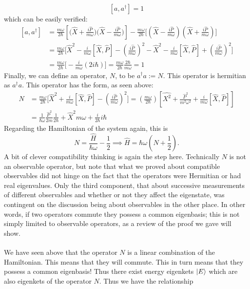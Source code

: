 $$
[a,a^{\dagger}]=1
$$
which can be easily verified:
$$
\begin{aligned}
[a,a^{\dagger}]&=\frac{m\omega}{2\hbar}\left[\biggl(\hat{X}+\frac{i\hat{P}}{m\omega}\biggr)\biggl(\hat{X}-\frac{i\hat{P}}{m\omega}\biggr)\right]-\frac{m\omega}{2\hbar}\biggl[\left(\hat{X}-\frac{i\hat{P}}{m\omega}\right)\left(\hat{X}+\frac{i\hat{P}}{m\omega}\right)\biggr]\\
&=\frac{m\omega}{2\hbar}\biggl[\hat{X}^{2}-\frac{i}{m\omega}[\hat{X},\hat{P}]-\left(\frac{i\hat{P}}{m\omega}\right)^2-\hat{X}^2-\frac{i}{m\omega}[\hat{X},\hat{P}]+\left(\frac{i\hat{P}}{m\omega}\right)^2\biggr]\\
&=\frac{m\omega}{2\hbar}\biggl[-\frac{i}{m\omega}(2i\hbar)\biggr]=\frac{m\omega}{2\hbar}\frac{2\hbar}{m\omega}=1
\end{aligned}
$$
Finally, we can define an operator, $N$, to be $a^{\dagger}a:=N$. This operator is hermitian as $a^{\dagger}a$.
This operator has the form, as seen above:
$$
\begin{aligned}
N&=\frac{m\omega}{2\hbar}\biggl[\hat{X}^2+\frac{i}{m\omega}[\hat{X},\hat{P}]-\left(\frac{i\hat{P}}{m\omega}\right)^2\biggr]=\left(\frac{m\omega}{2\hbar}\right)\left[\hat{X^2}+\frac{\hat{P}^2}{m^2\omega^2}+\frac{i}{m\omega}[\hat{X},\hat{P}]\right]\\
&=\frac{1}{\hbar\omega}\frac{\hat{P}^2}{2m}\frac{1}{2\hbar}+{\hat{X}^2}m\omega+\frac{i}{2\hbar}i\hbar
\end{aligned}
$$
Regarding the Hamiltonian of the system again, this is 
$$
N=\frac{\hat{H}}{\hbar\omega}-\frac{1}{2}\implies\hat{H}=\hbar\omega\left(N+\frac{1}{2}\right).
$$
A bit of clever compatibility thinking is again the step here. Technically $N$ is not an observable operator, but note that what we proved about compatible observables did not hinge on the fact that the operators were Hermitian or had real eigenvalues. Only the third component, that about successive measurements of different observables and whether or not they affect the eigenstate, was contingent on the discussion being about observables in the other place.
In other words, if two operators commute they possess a common eigenbasis; this is not simply limited to observable operators, as a review of the proof we gave will show.
\\\\
We have seen above that the operator $N$ is a linear combination of the Hamiltonian. This means that they will commute. This in turn means that they possess a common eigenbasis! Thus there exist energy eigenkets $|E\rangle$ which are also eigenkets of the operator $N$. Thus we have the relationship
